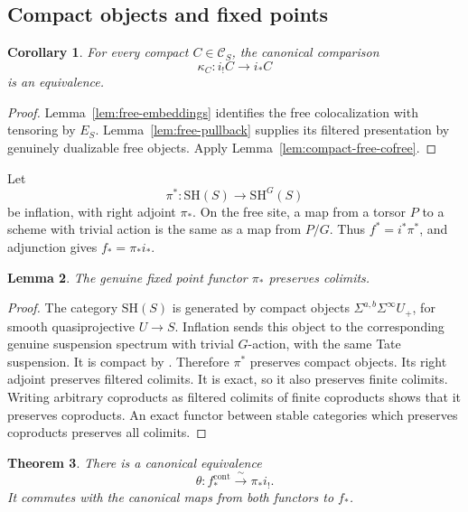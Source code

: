 \documentclass[11pt,reqno]{amsart}
\newtheorem{theorem}{Theorem}[section]
\newtheorem{lemma}[theorem]{Lemma}
\newtheorem{corollary}[theorem]{Corollary}
\theoremstyle{definition}
\theoremstyle{remark}
\theoremstyle{plain}
\numberwithin{equation}{section}
\newcommand{\SH}{\mathrm{SH}}
\newcommand{\cont}{\mathrm{cont}}
\begin{document}
\subsection{Compact objects and fixed points}

\begin{corollary}\label{cor:genuine-compact-free-cofree}
For every compact \(C\in\mathcal C_S\), the canonical comparison
\[
 \kappa_C:i_!C\longrightarrow i_*C
\]
is an equivalence.
\end{corollary}
\begin{proof}
Lemma~\ref{lem:free-embeddings} identifies the free colocalization with tensoring by \(E_S\).
Lemma~\ref{lem:free-pullback} supplies its filtered presentation by genuinely dualizable free objects.
Apply Lemma~\ref{lem:compact-free-cofree}.
\end{proof}

Let
\[
 \pi^*:\SH(S)\longrightarrow\SH^G(S)
\]
be inflation, with right adjoint \(\pi_*\).
On the free site, a map from a torsor \(P\) to a scheme with trivial
action is the same as a map from \(P/G\).
Thus \(f^*=i^*\pi^*\), and adjunction gives \(f_*=\pi_*i_*\).

\begin{lemma}\label{lem:genuine-fixed-continuous}
The genuine fixed point functor \(\pi_*\) preserves colimits.
\end{lemma}

\begin{proof}
The category \(\SH(S)\) is generated by compact objects
\(\Sigma^{a,b}\Sigma^\infty U_+\), for smooth quasiprojective
\(U\to S\).
Inflation sends this object to the corresponding genuine suspension
spectrum with trivial \(G\)-action, with the same Tate suspension.
It is compact by \cite[Proposition 6.4(3)]{Hoyois}.
Therefore \(\pi^*\) preserves compact objects.
Its right adjoint preserves filtered colimits.
It is exact, so it also preserves finite colimits.
Writing arbitrary coproducts as filtered colimits of finite coproducts
shows that it preserves coproducts.
An exact functor between stable categories which preserves coproducts
preserves all colimits.
\end{proof}

\begin{theorem}\label{thm:genuine-continuous-comparison}
There is a canonical equivalence
\[
 \theta:f_*^{\cont}\xrightarrow{\ \sim\ }\pi_*i_!.
\]
It commutes with the canonical maps from both functors to \(f_*\).
\end{theorem}
\end{document}

